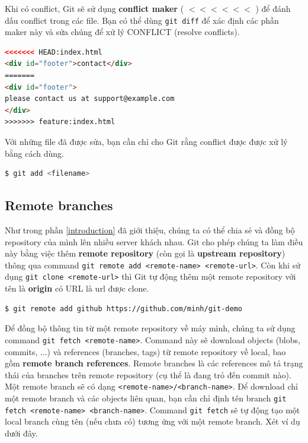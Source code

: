 \documentclass[a4paper, 11pt]{article}
\begin{document}
Khi có conflict, Git sẽ sử dụng \textbf{conflict maker} ( $<<<<<<$ ) để đánh dấu conflict trong các file. Bạn có thể dùng \texttt{git diff} để xác định các phần maker này và sửa chúng để xử lý CONFLICT (resolve conflicts). 

\begin{lstlisting}[language=html]
<<<<<<< HEAD:index.html
<div id="footer">contact</div>
=======
<div id="footer">
please contact us at support@example.com
</div>
>>>>>>> feature:index.html
\end{lstlisting}

Với những file đã được sửa, bạn cần chỉ cho Git  rằng conflict được được xử lý bằng cách dùng.

\begin{lstlisting}[language=bash]
$ git add <filename>
\end{lstlisting}

\subsection{Remote branches}
Như trong phần \ref{introduction} đã giới thiệu, chúng ta có thể chia sẻ và đồng bộ repository của mình lên nhiều server khách nhau. Git cho phép chúng ta làm điều này bằng việc thêm \textbf{remote repository} (còn gọi là \textbf{upstream repository}) thông qua command \texttt{git remote add <remote-name> <remote-url>}. Còn khi sử dụng \texttt{git clone <remote-url>} thì Git tự động thêm một remote repository với tên là \textbf{origin} có URL là url được clone.

\begin{lstlisting}[language=bash]
$ git remote add github https://github.com/minh/git-demo
\end{lstlisting}

Để đồng bộ thông tin từ một remote repository về máy mình, chúng ta sử dụng command \texttt{git fetch <remote-name>}. Command này sẽ download objects (blobs, commits, ...) và references (branches, tags) từ remote repository về local, bao gồm \textbf{remote branch references}. Remote branches là các references mô tả trạng thái của branches trên remote repository (cụ thể là đang trỏ đến commit nào). Một remote branch sẽ có dạng \texttt{<remote-name>/<branch-name>}. Để download chỉ một remote branch và các objects liên quan, bạn cần chỉ định tên branch \texttt{git fetch <remote-name> <branch-name>}. Command \texttt{git fetch} sẽ tự động tạo một local branch cùng tên (nếu chưa có) tương ứng với một remote branch. Xét ví dụ dưới đây.
\end{document}
